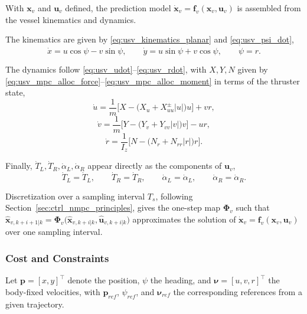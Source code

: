 With $\mathbf{x}_v$ and $\mathbf{u}_v$ defined, the prediction model $\dot{\mathbf{x}}_v = \mathbf{f}_v(\mathbf{x}_v,\mathbf{u}_v)$ is assembled from the vessel kinematics and dynamics.

The kinematics are given by \eqref{eq:usv_kinematics_planar} and \eqref{eq:usv_psi_dot},
\begin{equation}
    \dot x = u\cos\psi - v\sin\psi, \qquad \dot y = u\sin\psi + v\cos\psi, \qquad \dot\psi = r.
    \label{eq:usv_mpc_kinematics}
\end{equation}

The dynamics follow \eqref{eq:usv_udot}--\eqref{eq:usv_rdot}, with $X,Y,N$ given by \eqref{eq:usv_mpc_alloc_force}--\eqref{eq:usv_mpc_alloc_moment} in terms of the thruster state,
\begin{equation}
    \dot u = \frac{1}{m}\Big[X - \big(X_u+X_{uu}^{\pm}|u|\big)u\Big] + vr,
    \label{eq:usv_mpc_udot}
\end{equation}
\begin{equation}
    \dot v = \frac{1}{m}\Big[Y - \big(Y_v+Y_{vv}|v|\big)v\Big] - ur,
    \label{eq:usv_mpc_vdot}
\end{equation}
\begin{equation}
    \dot r = \frac{1}{I_z}\Big[N - \big(N_r+N_{rr}|r|\big)r\Big].
    \label{eq:usv_mpc_rdot}
\end{equation}

Finally, $\dot T_L,\dot T_R,\dot\alpha_L,\dot\alpha_R$ appear directly as the components of $\mathbf{u}_v$,
\begin{equation}
    \dot T_L = \dot T_L, \qquad \dot T_R = \dot T_R, \qquad \dot\alpha_L = \dot\alpha_L, \qquad \dot\alpha_R = \dot\alpha_R.
    \label{eq:usv_mpc_thruster_rates}
\end{equation}

Discretization over a sampling interval $T_s$, following Section~\ref{sec:ctrl_nmpc_principles}, gives the one-step map $\boldsymbol\Phi_v$ such that $\hat{\mathbf{x}}_{v,k+i+1|k} = \boldsymbol\Phi_v\big(\hat{\mathbf{x}}_{v,k+i|k}, \hat{\mathbf{u}}_{v,k+i|k}\big)$ approximates the solution of $\dot{\mathbf{x}}_v = \mathbf{f}_v(\mathbf{x}_v,\mathbf{u}_v)$ over one sampling interval.


\subsubsection*{Cost and Constraints}
 
Let $\mathbf{p} = [x,y]^\top$ denote the position, $\psi$ the heading, and $\boldsymbol{\nu} = [u,v,r]^\top$ the body-fixed velocities, with $\mathbf{p}_{ref}$, $\psi_{ref}$, and $\boldsymbol{\nu}_{ref}$ the corresponding references from a given trajectory.

